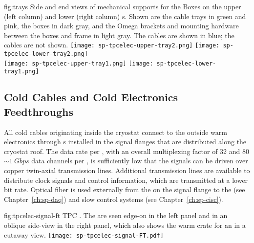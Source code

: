 \begin{dunefigure}
{fig:trays}
{Side and end views of mechanical supports for the  
Boxes on the upper (left column) and lower (right column) 
s. Shown are the  cable trays in green and pink, 
the  boxes in dark gray, and the Omega brackets and mounting 
hardware between the  boxes and  frame in light gray.  
The  cables are shown in blue; the  cables are not shown.}
\texttt{[image: sp-tpcelec-upper-tray2.png]}
\hspace{5mm}
\texttt{[image: sp-tpcelec-lower-tray2.png]} \\
\texttt{[image: sp-tpcelec-upper-tray1.png]}
\hspace{5mm}
\texttt{[image: sp-tpcelec-lower-tray1.png]}
\end{dunefigure}



\subsection{Cold Cables and Cold Electronics Feedthroughs}
\label{sec:fdsp-tpcelec-design-ft}

All cold cables originating inside the cryostat connect to the outside 
warm electronics through  \fdth{}s installed in the signal 
flanges that are distributed along the cryostat roof. The  data rate 
per , with an overall multiplexing factor of \num{32} and 
\num{80} $\sim\SI{1}{Gbps}$ data channels per , is 
sufficiently low that the  signals can be driven over 
copper twin-axial transmission lines. Additional transmission lines 
are available to distribute  clock signals and  
control information, which are transmitted at a lower bit rate.
Optical fiber is used externally from the  on the signal 
flange to the  (see Chapter~\ref{ch:sp-daq}) and slow 
control systems (see Chapter~\ref{ch:sp-cisc}).

\begin{dunefigure}
{fig:tpcelec-signal-ft}
{TPC  \fdth. The  are seen edge-on in the left 
panel and in an oblique side-view in the right panel, which also shows 
the warm crate for an  in a cutaway view.}
\texttt{[image: sp-tpcelec-signal-FT.pdf]}
\end{dunefigure}

